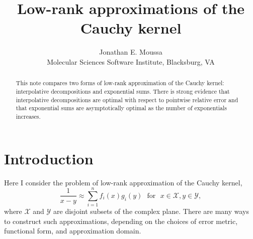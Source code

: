 \documentclass[12pt]{article}
\title{\vspace{-0.7in}Low-rank approximations of the Cauchy kernel}
\author{Jonathan E. Moussa \\ Molecular Sciences Software Institute, Blacksburg, VA}
\date{}
\begin{document}
\maketitle

\begin{abstract}
This note compares two forms of low-rank approximation of the Cauchy kernel: interpolative decompositions and exponential sums.
There is strong evidence that interpolative decompositions are optimal with respect to pointwise relative error and that exponential sums are asymptotically optimal as the number of exponentials increases.
\end{abstract}

\section{Introduction}

Here I consider the problem of low-rank approximation of the Cauchy kernel,
\begin{equation} \label{low_rank}
 \frac{1}{x-y} \approx \sum_{i=1}^n f_i(x) g_i(y) \ \ \ \mathrm{for} \ \ \ x \in \mathcal{X}, y \in \mathcal{Y},
\end{equation}
 where $\mathcal{X}$ and $\mathcal{Y}$ are disjoint subsets of the complex plane.
There are many ways to construct such approximations, depending on the choices of error metric, functional form, and approximation domain.
\end{document}
